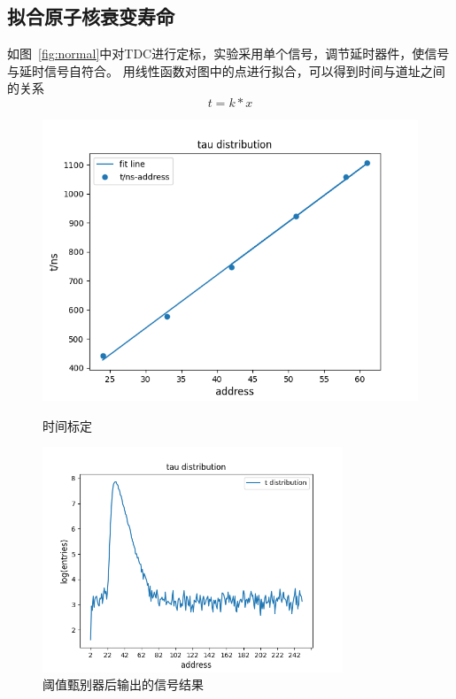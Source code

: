\documentclass[12pt]{ctexart}
\begin{document}
\subsection{拟合原子核衰变寿命}
如图~\ref{fig:normal}中对TDC进行定标，实验采用单个信号，调节延时器件，使信号与延时信号自符合。
用线性函数对图中的点进行拟合，可以得到时间与道址之间的关系
\[t=k*x\]
\begin{figure}[htbp]
    \centering
    \begin{minipage}{0.45\textwidth}
        \centering
        \includegraphics[width=\textwidth]{data/normal.png}
        \caption{时间标定}
        \label{fig:normal}
    \end{minipage}
    \qquad
    \begin{minipage}{0.45\textwidth}
        \centering
        \includegraphics[width=0.8\textwidth]{data/fit.png}
        \caption{阈值甄别器后输出的信号结果}
        \label{fig:logtau}
    \end{minipage}
\end{figure}
\end{document}
